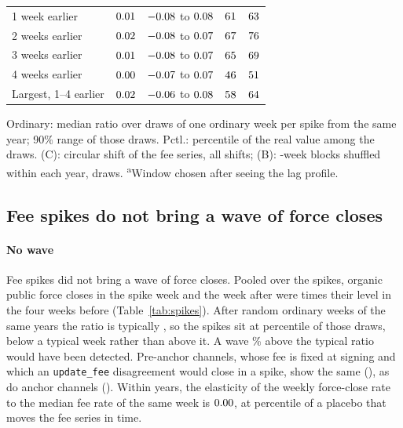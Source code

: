 \begin{table}[t]
\begin{tabular}{lrrrr}
1 week earlier & $0.01$ & $-0.08$ to $0.08$ & $61$ & $63$ \\
2 weeks earlier & $0.02$ & $-0.08$ to $0.07$ & $67$ & $76$ \\
3 weeks earlier & $0.01$ & $-0.08$ to $0.07$ & $65$ & $69$ \\
4 weeks earlier & $0.00$ & $-0.07$ to $0.07$ & $46$ & $51$ \\
Largest, 1--4 earlier & $0.02$ & $-0.06$ to $0.08$ & $58$ & $64$ \\
\bottomrule
\end{tabular}
\par\smallskip\parbox{\linewidth}{\scriptsize Ordinary: median ratio over \PlWeekDraws{} draws of one ordinary week
per spike from the same year; 90\% range of those draws. Pctl.: percentile of the real value among the draws. (C):
circular shift of the fee series, all \PlShifts{} shifts; (B): \PlBlockWeeks-week blocks shuffled within each year,
\PlBlockDraws{} draws. \textsuperscript{a}Window chosen after seeing the lag profile.}
\end{table}

\subsection{Fee spikes do not bring a wave of force closes}

\paragraph{No wave}
Fee spikes did not bring a wave of force closes. Pooled over the \NSpikes{} spikes, organic public force closes in
the spike week and the week after were \PlEvAllNow{} times their level in the four weeks before
(Table~\ref{tab:spikes}). After random ordinary weeks of the same years the ratio is typically \PlEvAllNowMed, so the
spikes sit at percentile \PlEvAllNowPct{} of those draws, below a typical week rather than above it. A wave
\PlDetectableWavePct\% above the typical ratio would have been detected. Pre-anchor channels, whose fee is fixed at
signing and which an \texttt{update\_fee} disagreement would close in a spike, show the same (\PlEvLegacyNow), as do
anchor channels (\PlEvAnchorNow). Within years, the elasticity of the weekly force-close rate to the median fee rate
of the same week is $0.00$, at percentile \PlSameWeekCircPct{} of a placebo that moves the fee series in
time.

